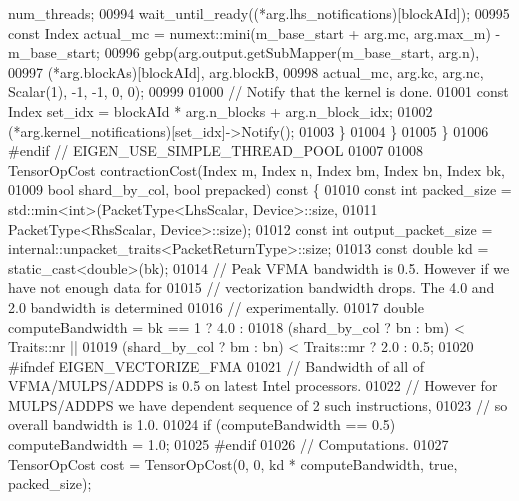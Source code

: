 \begin{DoxyCode}
{      num\_threads;
00994         wait\_until\_ready((*arg.lhs\_notifications)[blockAId]);
00995         \textcolor{keyword}{const} Index actual\_mc = numext::mini(m\_base\_start + arg.mc, arg.max\_m) - m\_base\_start;
00996         gebp(arg.output.getSubMapper(m\_base\_start, arg.n),
00997              (*arg.blockAs)[blockAId], arg.blockB,
00998              actual\_mc, arg.kc, arg.nc, Scalar(1), -1, -1, 0, 0);
00999 
01000         \textcolor{comment}{// Notify that the kernel is done.}
01001         \textcolor{keyword}{const} Index set\_idx = blockAId * arg.n\_blocks + arg.n\_block\_idx;
01002         (*arg.kernel\_notifications)[set\_idx]->Notify();
01003       \}
01004     \}
01005   \}
01006 \textcolor{preprocessor}{#endif  // EIGEN\_USE\_SIMPLE\_THREAD\_POOL}
01007 
01008   TensorOpCost contractionCost(Index m, Index n, Index bm, Index bn, Index bk,
01009                                \textcolor{keywordtype}{bool} shard\_by\_col, \textcolor{keywordtype}{bool} prepacked)\textcolor{keyword}{ const }\{
01010     \textcolor{keyword}{const} \textcolor{keywordtype}{int} packed\_size = std::min<int>(PacketType<LhsScalar, Device>::size,
01011                                           PacketType<RhsScalar, Device>::size);
01012     \textcolor{keyword}{const} \textcolor{keywordtype}{int} output\_packet\_size = internal::unpacket\_traits<PacketReturnType>::size;
01013     \textcolor{keyword}{const} \textcolor{keywordtype}{double} kd = \textcolor{keyword}{static\_cast<}\textcolor{keywordtype}{double}\textcolor{keyword}{>}(bk);
01014     \textcolor{comment}{// Peak VFMA bandwidth is 0.5. However if we have not enough data for}
01015     \textcolor{comment}{// vectorization bandwidth drops. The 4.0 and 2.0 bandwidth is determined}
01016     \textcolor{comment}{// experimentally.}
01017     \textcolor{keywordtype}{double} computeBandwidth = bk == 1 ? 4.0 :
01018           (shard\_by\_col ? bn : bm) < Traits::nr ||
01019           (shard\_by\_col ? bm : bn) < Traits::mr ? 2.0 : 0.5;
01020 \textcolor{preprocessor}{#ifndef EIGEN\_VECTORIZE\_FMA}
01021     \textcolor{comment}{// Bandwidth of all of VFMA/MULPS/ADDPS is 0.5 on latest Intel processors.}
01022     \textcolor{comment}{// However for MULPS/ADDPS we have dependent sequence of 2 such instructions,}
01023     \textcolor{comment}{// so overall bandwidth is 1.0.}
01024     \textcolor{keywordflow}{if} (computeBandwidth == 0.5) computeBandwidth = 1.0;
01025 \textcolor{preprocessor}{#endif}
01026     \textcolor{comment}{// Computations.}
01027     TensorOpCost cost = TensorOpCost(0, 0, kd * computeBandwidth, \textcolor{keyword}{true}, packed\_size);
}
\end{DoxyCode}
